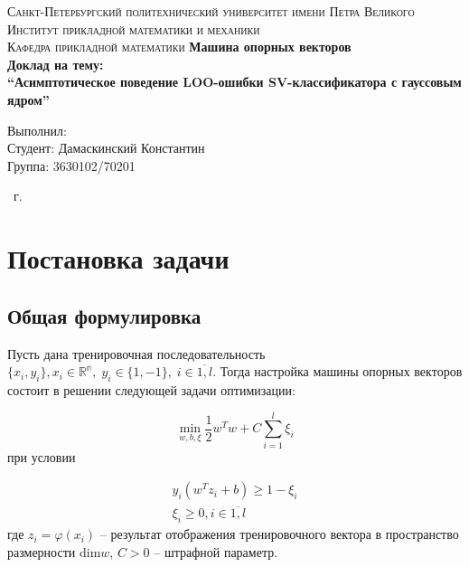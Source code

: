 \documentclass[14pt,a4paper,article]{ncc}
\numberwithin{equation}{subsection}
\begin{document}
\begin{titlepage}
    \begin{center}
        \textsc{
            Санкт-Петербургский политехнический университет имени Петра Великого \\[5mm]
            Институт прикладной математики и механики\\[2mm]
            Кафедра прикладной математики
        }   
        \vfill
        \textbf{\large
            Машина опорных векторов\\
            Доклад на тему: \\[3mm]
            ``Асимптотическое поведение LOO-ошибки SV-классификатора с гауссовым ядром''
        }                
    \end{center}

    \vfill
    \hfill
    \begin{minipage}{0.5\textwidth}
        Выполнил: \\[2mm]   
		Студент: Дамаскинский Константин \\
		Группа: 3630102/70201\\
    \end{minipage}


    \vfill
    \begin{center}
        \theyear\ г.
    \end{center}
\end{titlepage}

\tableofcontents
\listoffigures
\newpage

\section{Постановка задачи}

\subsection{Общая формулировка}
Пусть дана тренировочная последовательность $\{x_i, y_i\}, x_i \in \mathbb{R^n}, \; y_i \in \{1, -1\}, \; i \in \overline{1,l}$. Тогда настройка машины опорных векторов состоит в решении следующей задачи оптимизации:

\begin{equation}
\min_{w, b, \xi} \frac{1}{2}w^Tw + C \displaystyle \sum_{i = 1}^{l}\xi_i
\end{equation}
при условии

\begin{align}
y_i(w^T z_i + b) \geq 1 - \xi_i \\
\xi_i \geq 0, i \in \overline{1,l}
\end{align}
где $z_i= \varphi(x_i)$ -- результат отображения тренировочного вектора в пространство размерности $\textrm{dim} w$, $C > 0$ -- штрафной параметр.
\end{document}
